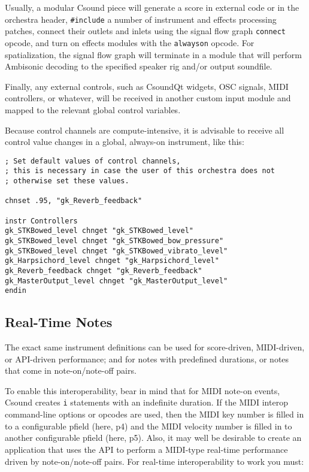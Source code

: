 \documentclass[12pt,letterpaper,onecolumn]{scrartcl}
\begin{document}
\begin{enumerate}
Usually, a modular Csound piece will generate a score in external code or in 
the orchestra header, \texttt{\#include} a number of instrument and effects 
processing patches, connect their outlets and inlets using the signal flow 
graph \texttt{connect} opcode, and turn on effects modules with the 
\texttt{alwayson} opcode. For spatialization, the signal flow graph will 
terminate in a module that will perform Ambisonic decoding to the specified 
speaker rig and/or output soundfile.

Finally, any external controls, such as CsoundQt widgets, OSC signals, MIDI 
controllers, or whatever, will be received in another custom input module and 
mapped to the relevant global control variables.

Because control channels are compute-intensive, it is advisable to receive all 
control value changes in a global, always-on instrument, like this:

\begin{lstlisting}
; Set default values of control channels,
; this is necessary in case the user of this orchestra does not
; otherwise set these values.

chnset .95, "gk_Reverb_feedback"

instr Controllers
gk_STKBowed_level chnget "gk_STKBowed_level"
gk_STKBowed_level chnget "gk_STKBowed_bow_pressure"
gk_STKBowed_level chnget "gk_STKBowed_vibrato_level"
gk_Harpsichord_level chnget "gk_Harpsichord_level"
gk_Reverb_feedback chnget "gk_Reverb_feedback"
gk_MasterOutput_level chnget "gk_MasterOutput_level"
endin
\end{lstlisting}

\subsection{Real-Time Notes}

The exact same instrument definitions can be used for score-driven, 
MIDI-driven, or API-driven performance; and for notes with predefined 
durations, or notes that come in note-on/note-off pairs.

To enable this interoperability, bear in mind that for MIDI note-on events, 
Csound creates \texttt{i} statements with an indefinite duration. If the MIDI 
interop command-line options or opcodes are used, then the MIDI key number is 
filled in to a configurable pfield (here, p4) and the MIDI velocity number is 
filled in to another configurable pfield (here, p5). Also, it may well be 
desirable to create an application that uses the API to perform a MIDI-type 
real-time performance driven by note-on/note-off pairs. For real-time 
interoperability to work you must:


\end{enumerate}
\end{document}
